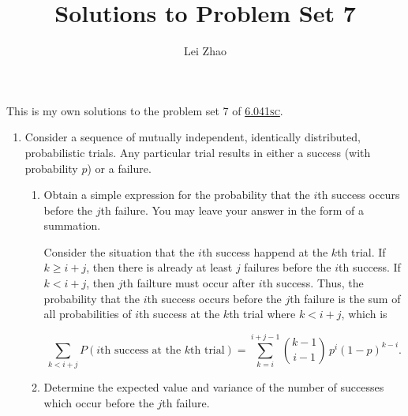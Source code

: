 

\title{Solutions to Problem Set 7}
\author{Lei Zhao}

\usepackage{xcolor}
\hypersetup{allcolors=linkcolor,linkcolor=black}
\renewcommand{\thefootnote}{\fnsymbol{footnote}}


\maketitle

This is my own solutions to the problem set 7 of
\href{https://ocw.mit.edu/courses/electrical-engineering-and-computer-science/6-041sc-probabilistic-systems-analysis-and-applied-probability-fall-2013/unit-iii/lecture-15/}{6.041\textsc{sc}}.

\begin{enumerate}
  \item Consider a sequence of mutually independent, identically
  distributed, probabilistic trials.  Any particular trial results in
  either a success (with probability \(p\)) or a failure.
  \begin{enumerate}
  \item {} Obtain a simple expression for the
    probability that the \(i\)th success occurs before the \(j\)th
    failure.  You may leave your answer in the form of a summation.

    Consider the situation that the \(i\)th success happend at the
    \(k\)th trial.  If \(k \ge i+j\), then there is already at least
    \(j\) failures before the \(i\)th success.  If \(k < i+j\), then
    \(j\)th failture must occur after \(i\)th success.  Thus, the
    probability that the \(i\)th success occurs before the \(j\)th
    failure is the sum of all probabilities of \(i\)th success at the
    \(k\)th trial where \(k < i+j\), which is

    \[\sum_{k<i+j} P(i\text{th success at the }k\text{th trial}) = \sum_{k=i}^{i+j-1} \binom{k-1}{i-1} \, p^i (1-p)^{k-i}.\]

  \item {} Determine the expected value and variance
    of the number of successes which occur before the \(j\)th failure.


\end{enumerate}
\end{enumerate}
